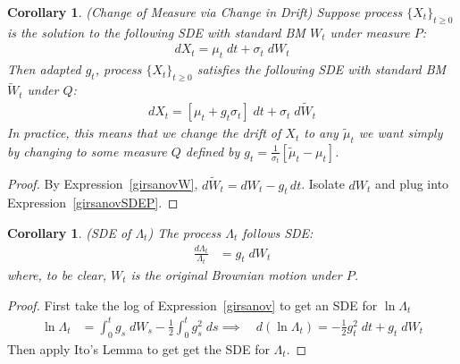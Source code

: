 \documentclass[12pt]{article}
\theoremstyle{plain}
\newtheorem{cor}[thm]{Corollary}
\theoremstyle{definition}
\theoremstyle{remark}
\begin{document}
\begin{cor}\emph{(Change of Measure via Change in Drift)}
Suppose process $\{X_t\}_{t\geq 0}$ is the solution to the following
SDE with standard BM $W_t$ under measure $P$:
\begin{align}
  dX_t = \mu_t \;dt + \sigma_t \; dW_t
  \label{girsanovSDEP}
\end{align}
Then adapted $g_t$, process $\{X_t\}_{t\geq 0}$ satisfies the following
SDE with standard BM $\tilde{W}_t$ under $Q$:
\begin{align}
  dX_t = [\mu_t + g_t\sigma_t]\;dt + \sigma_t \; d\tilde{W}_t
  \label{girsanovSDEQ}
\end{align}
In practice, this means that we change the drift of $X_t$ to any
$\tilde{\mu}_t$ we want simply by changing to some measure $Q$ defined
by $g_t= \frac{1}{\sigma_t} [ \tilde{\mu}_t-\mu_t ]$.
\end{cor}
\begin{proof}
By Expression~\ref{girsanovW}, $d\tilde{W}_t=dW_t-g_t\,dt$.
Isolate $dW_t$ and plug into Expression~\ref{girsanovSDEP}.
\end{proof}


\begin{cor}\emph{(SDE of $\Lambda_t$)}
The process $\Lambda_t$ follows SDE:
\begin{align*}
  \frac{d\Lambda_t}{\Lambda_t} &= g_t\;dW_t
\end{align*}
where, to be clear, $W_t$ is the original Brownian motion under $P$.
\end{cor}
\begin{proof}
First take the log of Expression~\ref{girsanov} to get an SDE for
$\ln \Lambda_t$
\begin{align*}
  \ln \Lambda_t
  &=
  \int_0^t g_s\;dW_s
  - \frac{1}{2} \int_0^t g_s^2 \;ds
  \implies\quad
  d(\ln \Lambda_t)
  =
  - \frac{1}{2} g_t^2\;dt
  + g_t\;dW_t
\end{align*}
Then apply Ito's Lemma to get get the SDE for $\Lambda_t$.
\end{proof}



\end{document}

